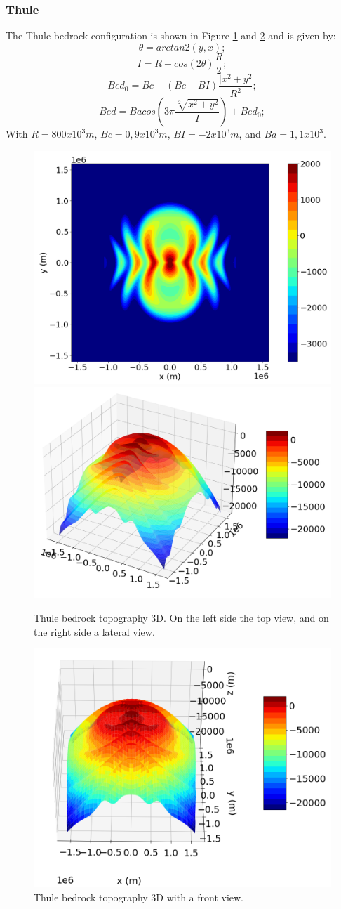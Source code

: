 \documentclass{article}
\begin{document}
 \subsubsection{Thule}
 The Thule bedrock configuration is shown in Figure \ref{Thule_3D} and \ref{Thule_3D1} and is given by:
	\begin{equation}
		\theta=arctan2(y,x);
	\end{equation}
	\begin{equation}
		I=R-cos(2\theta)\frac{R}{2};
	\end{equation}
	\begin{equation}
		Bed_0=Bc-(Bc-BI)\frac{|x^2+y^2}{R^2};
	\end{equation}
	\begin{equation}
		Bed=Bacos(3\pi\frac{\sqrt[2]{x^2+y^2}}{I})+Bed_0;
	\end{equation}
	With $R=800 x 10^3 m$, $Bc=0,9 x 10^3 m$, $BI=-2 x 10^3 m$, and $Ba=1,1 x 10^3$.
	\begin{figure}[!h]
		\centering
		\includegraphics[width=0.45\linewidth]{../fig/Thule_2D}
		\includegraphics[width=0.45\linewidth]{../fig/Thule_3D}
		\caption{Thule bedrock topography 3D. On the left side the top view, and on the right side a lateral view.}
		\label{Thule_3D}
	\end{figure}
	\begin{figure}[!h]
	\centering
	\includegraphics[width=0.45\linewidth]{../fig/Thule_3D1}
	\caption{Thule bedrock topography 3D with a front view.}
	\label{Thule_3D1}
\end{figure}
\end{document}
